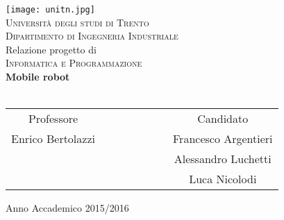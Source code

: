 
\begin{titlepage}
 \begin{center}
     \texttt{[image: unitn.jpg]}\\
     \vspace{1em}
     {\Large \textsc{Università degli studi di Trento}}\\
     \vspace{1em}
     {\Large \textsc{Dipartimento di Ingegneria Industriale}}\\
     \vspace{4em}
     {\normalsize Relazione progetto di }\\
     \vspace{1em}
     {\Large \textsc{Informatica e Programmazione}}\\
     \vspace{4em}
     {\LARGE\textbf{
     	Mobile robot\\\vspace{0.4em}
     }}\\
 \end{center}

\vskip 2.0cm
  \begin{center}
    \begin{tabular}{c c c c c c c c}
      Professore & & & & & & & Candidato \\[0.2cm]
      \large{Enrico Bertolazzi} & & & & & & & \large{Francesco Argentieri}\\[0.2cm]
      & & & & & & & \large{Alessandro Luchetti}\\[0.2cm]
      & & & & & & & \large{Luca Nicolodi}\\    [0.2cm]
    \end{tabular}
  \end{center}

\vskip 1.5cm
\begin{center}
{\normalsize Anno Accademico 2015/2016}
\end{center}
\end{titlepage}

\clearpage{\pagestyle{empty}\cleardoublepage}
